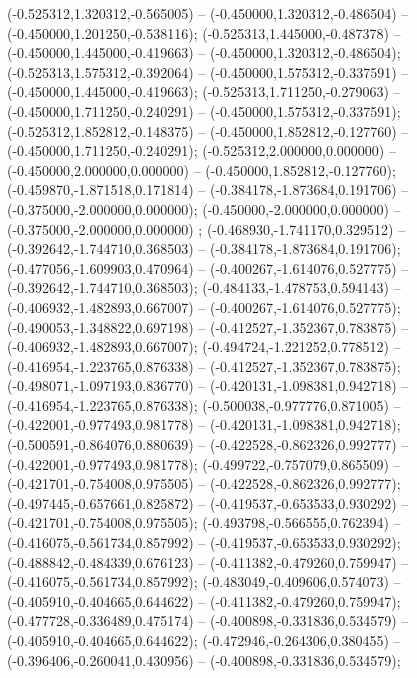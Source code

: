  (-0.525312,1.320312,-0.565005) -- (-0.450000,1.320312,-0.486504) -- (-0.450000,1.201250,-0.538116);
 (-0.525313,1.445000,-0.487378) -- (-0.450000,1.445000,-0.419663) -- (-0.450000,1.320312,-0.486504);
 (-0.525313,1.575312,-0.392064) -- (-0.450000,1.575312,-0.337591) -- (-0.450000,1.445000,-0.419663);
 (-0.525313,1.711250,-0.279063) -- (-0.450000,1.711250,-0.240291) -- (-0.450000,1.575312,-0.337591);
 (-0.525312,1.852812,-0.148375) -- (-0.450000,1.852812,-0.127760) -- (-0.450000,1.711250,-0.240291);
 (-0.525312,2.000000,0.000000) -- (-0.450000,2.000000,0.000000) -- (-0.450000,1.852812,-0.127760);
 (-0.459870,-1.871518,0.171814) -- (-0.384178,-1.873684,0.191706) -- (-0.375000,-2.000000,0.000000);
 (-0.450000,-2.000000,0.000000) -- (-0.375000,-2.000000,0.000000) ;
 (-0.468930,-1.741170,0.329512) -- (-0.392642,-1.744710,0.368503) -- (-0.384178,-1.873684,0.191706);
 (-0.477056,-1.609903,0.470964) -- (-0.400267,-1.614076,0.527775) -- (-0.392642,-1.744710,0.368503);
 (-0.484133,-1.478753,0.594143) -- (-0.406932,-1.482893,0.667007) -- (-0.400267,-1.614076,0.527775);
 (-0.490053,-1.348822,0.697198) -- (-0.412527,-1.352367,0.783875) -- (-0.406932,-1.482893,0.667007);
 (-0.494724,-1.221252,0.778512) -- (-0.416954,-1.223765,0.876338) -- (-0.412527,-1.352367,0.783875);
 (-0.498071,-1.097193,0.836770) -- (-0.420131,-1.098381,0.942718) -- (-0.416954,-1.223765,0.876338);
 (-0.500038,-0.977776,0.871005) -- (-0.422001,-0.977493,0.981778) -- (-0.420131,-1.098381,0.942718);
 (-0.500591,-0.864076,0.880639) -- (-0.422528,-0.862326,0.992777) -- (-0.422001,-0.977493,0.981778);
 (-0.499722,-0.757079,0.865509) -- (-0.421701,-0.754008,0.975505) -- (-0.422528,-0.862326,0.992777);
 (-0.497445,-0.657661,0.825872) -- (-0.419537,-0.653533,0.930292) -- (-0.421701,-0.754008,0.975505);
 (-0.493798,-0.566555,0.762394) -- (-0.416075,-0.561734,0.857992) -- (-0.419537,-0.653533,0.930292);
 (-0.488842,-0.484339,0.676123) -- (-0.411382,-0.479260,0.759947) -- (-0.416075,-0.561734,0.857992);
 (-0.483049,-0.409606,0.574073) -- (-0.405910,-0.404665,0.644622) -- (-0.411382,-0.479260,0.759947);
 (-0.477728,-0.336489,0.475174) -- (-0.400898,-0.331836,0.534579) -- (-0.405910,-0.404665,0.644622);
 (-0.472946,-0.264306,0.380455) -- (-0.396406,-0.260041,0.430956) -- (-0.400898,-0.331836,0.534579);
